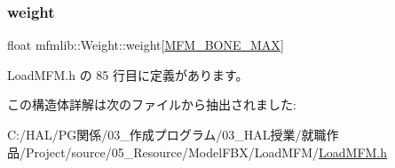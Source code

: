 \mbox{\label{structmfmlib_1_1_weight_a5345575156decb810031ff9deb30f5b7}} 
\subsubsection{\texorpdfstring{weight}{weight}}
{\footnotesize\ttfamily float mfmlib\+::\+Weight\+::weight\mbox{[}\mbox{\hyperlink{_load_m_f_m_8h_afae65bf8a30574b05ce5eb200453d4f9}{M\+F\+M\+\_\+\+B\+O\+N\+E\+\_\+\+M\+AX}}\mbox{]}}



 Load\+M\+F\+M.\+h の 85 行目に定義があります。



この構造体詳解は次のファイルから抽出されました\+:\begin{DoxyCompactItemize}
\item 
C\+:/\+H\+A\+L/\+P\+G関係/03\+\_\+作成プログラム/03\+\_\+\+H\+A\+L授業/就職作品/\+Project/source/05\+\_\+\+Resource/\+Model\+F\+B\+X/\+Load\+M\+F\+M/\mbox{\hyperlink{_load_m_f_m_8h}{Load\+M\+F\+M.\+h}}\end{DoxyCompactItemize}
